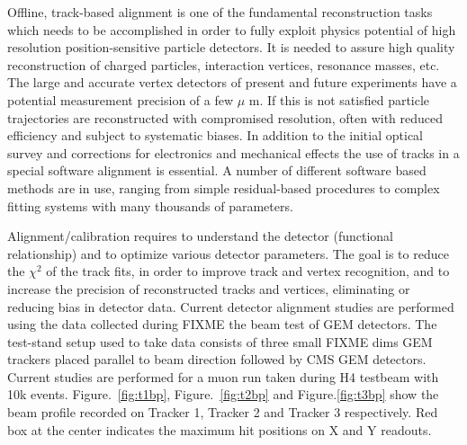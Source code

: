 Offline, track-based alignment is one of the fundamental reconstruction tasks which needs to be accomplished in order to fully exploit physics potential of high resolution position-sensitive particle detectors. It is needed to assure high quality reconstruction of charged particles, interaction vertices, resonance masses, etc. The large and accurate vertex detectors of present and future experiments have a potential measurement precision of a few $\mu$ m. If this is not satisfied particle trajectories are reconstructed with compromised resolution, often with reduced efficiency and subject to systematic biases. In addition to the initial optical survey and corrections for electronics and mechanical effects the use of tracks in a special software alignment is essential. A number of different software based methods are in use, ranging from simple residual-based procedures to complex fitting systems with many thousands of parameters.

Alignment/calibration requires to understand the detector (functional relationship) and to optimize various detector  parameters. The goal is to reduce the $\chi^{2}$ of the track fits, in order to improve track and vertex recognition, and to increase the precision of reconstructed tracks and vertices, eliminating or reducing bias in detector data.
Current detector alignment studies are performed using the data collected during FIXME the beam test of GEM detectors. The test-stand setup used to take data consists of three small FIXME dims GEM trackers placed parallel to beam direction followed by CMS GEM detectors. 
Current studies are performed for a muon run taken during H4 testbeam with 10k events.
Figure.~\ref{fig:t1bp}, Figure.~\ref{fig:t2bp} and Figure.\ref{fig:t3bp} show the beam profile recorded on Tracker 1, Tracker 2 and Tracker 3 respectively. 
Red box at the center indicates the maximum hit positions on X and Y readouts.

